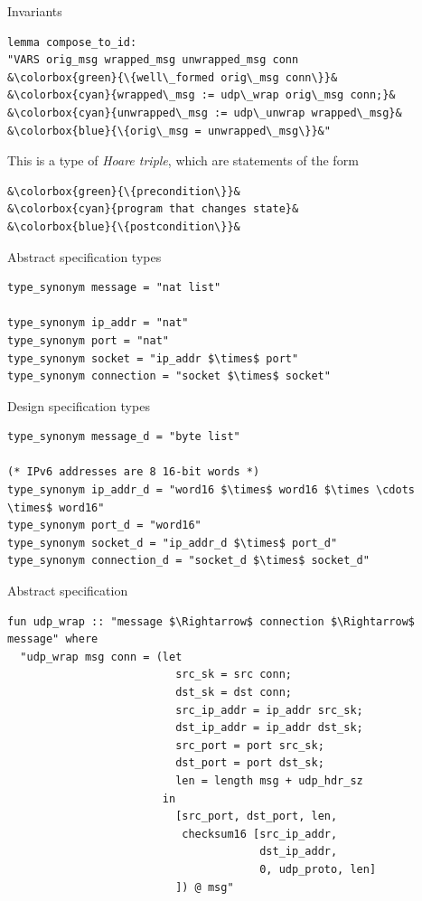 \documentclass{beamer}
\begin{document}
\begin{frame}[fragile]{Invariants}
    \begin{lstlisting}[language=isabelle]
lemma compose_to_id:
"VARS orig_msg wrapped_msg unwrapped_msg conn
&\colorbox{green}{\{well\_formed orig\_msg conn\}}&
&\colorbox{cyan}{wrapped\_msg := udp\_wrap orig\_msg conn;}&
&\colorbox{cyan}{unwrapped\_msg := udp\_unwrap wrapped\_msg}&
&\colorbox{blue}{\{orig\_msg = unwrapped\_msg\}}&"
    \end{lstlisting}

    \pause
    \vspace{20pt}
    This is a type of \textit{Hoare triple}, which are statements of the form
    \begin{lstlisting}[language=isabelle]
&\colorbox{green}{\{precondition\}}&
&\colorbox{cyan}{program that changes state}&
&\colorbox{blue}{\{postcondition\}}&
    \end{lstlisting}
\end{frame}


\begin{frame}[fragile]{Abstract specification types}
    \begin{lstlisting}[language=isabelle]
type_synonym message = "nat list"

type_synonym ip_addr = "nat"
type_synonym port = "nat"
type_synonym socket = "ip_addr $\times$ port"
type_synonym connection = "socket $\times$ socket"

    \end{lstlisting}
\end{frame}

\begin{frame}[fragile]{Design specification types}
    \begin{lstlisting}[language=isabelle]
type_synonym message_d = "byte list"

(* IPv6 addresses are 8 16-bit words *)
type_synonym ip_addr_d = "word16 $\times$ word16 $\times \cdots \times$ word16"
type_synonym port_d = "word16"
type_synonym socket_d = "ip_addr_d $\times$ port_d"
type_synonym connection_d = "socket_d $\times$ socket_d"
    \end{lstlisting}
\end{frame}

\begin{frame}[fragile]{Abstract specification}
    \begin{lstlisting}[language=isabelle]
fun udp_wrap :: "message $\Rightarrow$ connection $\Rightarrow$ message" where
  "udp_wrap msg conn = (let
                          src_sk = src conn;
                          dst_sk = dst conn;
                          src_ip_addr = ip_addr src_sk;
                          dst_ip_addr = ip_addr dst_sk;
                          src_port = port src_sk;
                          dst_port = port dst_sk;
                          len = length msg + udp_hdr_sz
                        in
                          [src_port, dst_port, len,
                           checksum16 [src_ip_addr,
                                       dst_ip_addr,
                                       0, udp_proto, len]
                          ]) @ msg"
    \end{lstlisting}
\end{frame}
\end{document}
